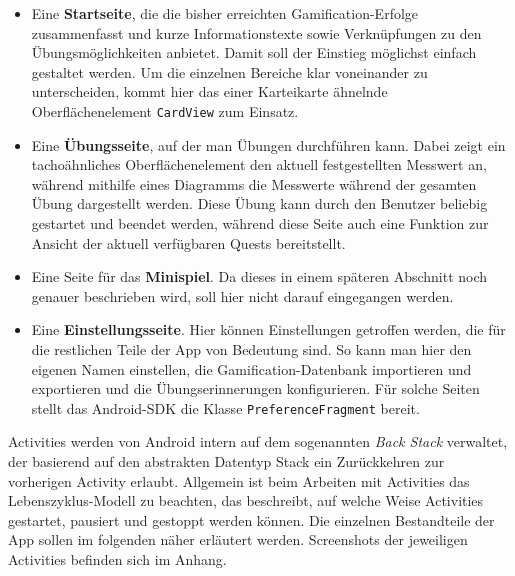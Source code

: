 \begin{itemize}
	\item Eine \textbf{Startseite}, die die bisher erreichten Gamification-Erfolge zusammenfasst und kurze Informationstexte sowie Verknüpfungen zu den Übungsmöglichkeiten anbietet. Damit soll der Einstieg möglichst einfach gestaltet werden. Um die einzelnen Bereiche klar voneinander zu unterscheiden, kommt hier das einer Karteikarte ähnelnde Oberflächenelement \texttt{CardView} zum Einsatz.
	\item Eine \textbf{Übungsseite}, auf der man Übungen durchführen kann. Dabei zeigt ein tachoähnliches Oberflächenelement den aktuell festgestellten Messwert an, während mithilfe eines Diagramms die Messwerte während der gesamten Übung dargestellt werden. Diese Übung kann durch den Benutzer beliebig gestartet und beendet werden, während diese Seite auch eine Funktion zur Ansicht der aktuell verfügbaren Quests bereitstellt.
	\item Eine Seite für das \textbf{Minispiel}. Da dieses in einem späteren Abschnitt noch genauer beschrieben wird, soll hier nicht darauf eingegangen werden.
	\item Eine \textbf{Einstellungsseite}. Hier können Einstellungen getroffen werden, die für die restlichen Teile der App von Bedeutung sind. So kann man hier den eigenen Namen einstellen, die Gamification-Datenbank importieren und exportieren und die Übungserinnerungen konfigurieren. Für solche Seiten stellt das Android-SDK die Klasse \texttt{PreferenceFragment}\cite{Src:AndroidKuenneth} bereit.
\end{itemize}
Activities werden von Android intern auf dem sogenannten \textit{Back Stack} verwaltet, der basierend auf den abstrakten Datentyp Stack ein Zurückkehren zur vorherigen Activity erlaubt. Allgemein ist beim Arbeiten mit Activities das Lebenszyklus-Modell zu beachten, das beschreibt, auf welche Weise Activities gestartet, pausiert und gestoppt werden können.\cite{Src:AndroidKuenneth} Die einzelnen Bestandteile der App sollen im folgenden näher erläutert werden. Screenshots der jeweiligen Activities befinden sich im Anhang.
\newpage
